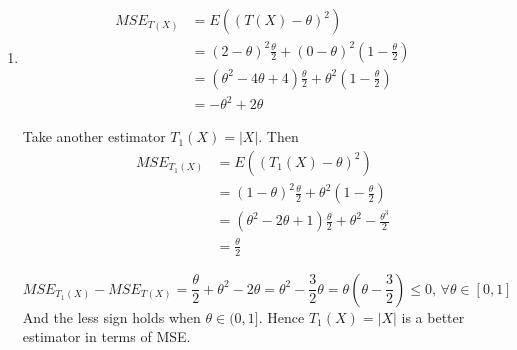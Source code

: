 \documentclass{article}
\begin{document}
\begin{enumerate}[leftmargin = 0 em, label = \arabic*., font = \bfseries]
\begin{enumerate}
 	 		\item 
 	 		\begin{align*}
 	 		MSE_{T(X)} &= E((T(X) - \theta)^2)\\
 	 		& = (2 - \theta)^2 \frac{\theta}{2} + (0 - \theta)^2 (1 - \frac{\theta}{2})\\
 	 		& = (\theta^2 - 4 \theta + 4) \frac{\theta}{2} + \theta^2 (1 - \frac{\theta}{2})\\
 	 		& = - \theta^2 + 2 \theta 
 	 		\end{align*}

 	 		Take another estimator $T_1 (X) = |X|$. Then
 	 		\begin{align*}
 	 		MSE_{T_1 (X)}& = E((T_1 (X) - \theta)^2)\\
 	 		& = (1 - \theta)^2 \frac{\theta}{2} + \theta^2 (1 - \frac{\theta}{2})\\
 	 		& = (\theta^2 - 2 \theta + 1) \frac{\theta}{2} + \theta^2 - \frac{\theta^3}{2}\\
 	 		& = \frac{\theta}{2} 	 		
 	 		\end{align*}

 	 		\[MSE_{T_1(X)} - MSE_{T(X)} = \frac{\theta}{2} + \theta^2 - 2 \theta = \theta^2 - \frac{3}{2} \theta = \theta (\theta - \frac{3}{2}) \leq 0,\, \forall \theta \in [0,1]\]
 	 		And the less sign holds when $\theta \in (0,1]$. Hence $T_1 (X) = |X|$ is a better estimator in terms of MSE.
 	 		
 	 		
 	 		
 	 	\end{enumerate}
 	 	
 	 	
 	\end{enumerate}

	
	
	
	
\end{document}
